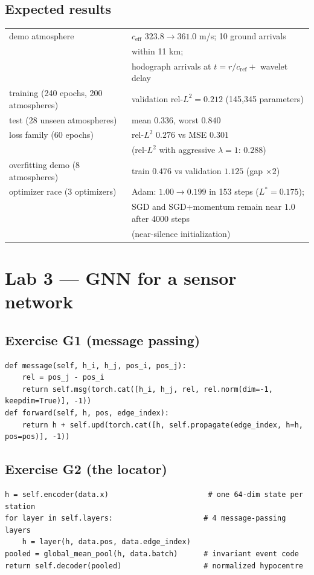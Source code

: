 \documentclass[11pt,a4paper]{article}
\begin{document}
\subsection*{Expected results}
\begin{center}
\begin{tabular}{@{}ll@{}}
\toprule
demo atmosphere & $c_\mathrm{eff}$ $323.8 \to 361.0$ m/s; 10 ground arrivals\\
 & within 11 km;\\
 & hodograph arrivals at $t = r/c_\mathrm{ref} + $ wavelet delay\\
training (240 epochs, 200 atmospheres) & validation rel-$L^2 = 0.212$ (145,345 parameters)\\
test (28 unseen atmospheres) & mean $0.336$, worst $0.840$\\
loss family (60 epochs) & rel-$L^2$ $0.276$ vs MSE $0.301$\\
 & (rel-$L^2$ with aggressive $\lambda=1$: $0.288$)\\
overfitting demo (8 atmospheres) & train $0.476$ vs validation $1.125$ (gap $\times 2$)\\
optimizer race (3 optimizers) & Adam: $1.00 \to 0.199$ in 153 steps ($L^* = 0.175$);\\
 & SGD and SGD+momentum remain near $1.0$ after 4000 steps\\
 & (near-silence initialization)\\
\bottomrule
\end{tabular}
\end{center}

\section{Lab 3 --- GNN for a sensor network}

\subsection*{Exercise G1 (message passing)}
\begin{lstlisting}
def message(self, h_i, h_j, pos_i, pos_j):
    rel = pos_j - pos_i
    return self.msg(torch.cat([h_i, h_j, rel, rel.norm(dim=-1, keepdim=True)], -1))
def forward(self, h, pos, edge_index):
    return h + self.upd(torch.cat([h, self.propagate(edge_index, h=h, pos=pos)], -1))
\end{lstlisting}
\subsection*{Exercise G2 (the locator)}
\begin{lstlisting}
h = self.encoder(data.x)                       # one 64-dim state per station
for layer in self.layers:                     # 4 message-passing layers
    h = layer(h, data.pos, data.edge_index)
pooled = global_mean_pool(h, data.batch)      # invariant event code
return self.decoder(pooled)                   # normalized hypocentre
\end{lstlisting}
\end{document}
